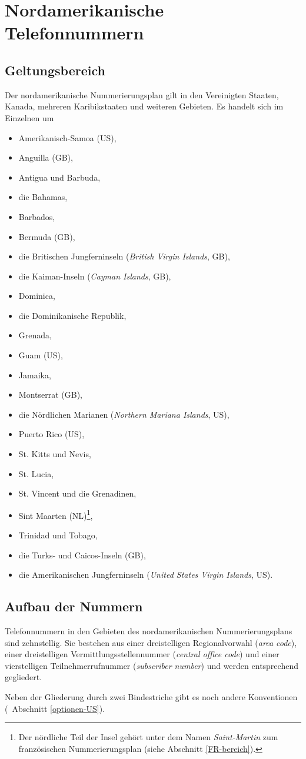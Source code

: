 \documentclass[numbers=noenddot]{scrreprt}
\newcommand{\UeberschriftGeltungsbereich}{\section{Geltungsbereich}}
\newcommand{\UeberschriftAufbau}{\section{Aufbau der Nummern}}
\newcommand*{\vglAbschnitt}[1]{(\cf\ Abschnitt \ref{#1})}
\newcommand*{\sieheAbschnitt}[1]{(siehe Abschnitt \ref{#1})}
\begin{document}
\chapter{Nordamerikanische Telefonnummern} \label{US}
\UeberschriftGeltungsbereich \label{US-bereich}
Der nordamerikanische Nummerierungsplan
\cite{wikipedia-NANP}
gilt in den Vereinigten Staaten, Kanada, mehreren Karibikstaaten und weiteren Gebieten. Es handelt sich im Einzelnen um
\begin{itemize}
\item Amerikanisch-Samoa (US),
\item Anguilla (GB),
\item Antigua und Barbuda,
\item die Bahamas,
\item Barbados,
\item Bermuda (GB),
\item die Britischen Jungferninseln (\emph{British Virgin Islands}, GB),
\item die Kaiman-Inseln (\emph{Cayman Islands}, GB),
\item Dominica,
\item die Dominikanische Republik,
\item Grenada,
\item Guam (US),
\item Jamaika,
\item Montserrat (GB),
\item die Nördlichen Marianen (\emph{Northern Mariana Islands}, US),
\item Puerto Rico (US),
\item St. Kitts und Nevis,
\item St. Lucia,
\item St. Vincent und die Grenadinen,
\item Sint Maarten (NL)\footnote{Der nördliche Teil der Insel gehört unter dem Namen \emph{Saint-Martin} zum französischen Nummerierungsplan
\sieheAbschnitt{FR-bereich}.},
\item Trinidad und Tobago,
\item die Turks- und Caicos-Inseln (GB),
\item die Amerikanischen Jungferninseln (\emph{United States Virgin Islands}, US).
\end{itemize}

\UeberschriftAufbau
Telefonnummern in den Gebieten des nordamerikanischen Nummerierungsplans sind zehnstellig. Sie bestehen aus einer dreistelligen Regionalvorwahl (\emph{area code}), einer dreistelligen Vermittlungsstellennummer (\emph{central office code}) und einer vierstelligen Teilnehmerrufnummer (\emph{subscriber number}) und werden entsprechend gegliedert.
\begin{sidebyside}
\end{sidebyside}
Neben der Gliederung durch zwei Bindestriche gibt es noch andere Konventionen
\vglAbschnitt{optionen-US}.
\end{document}
